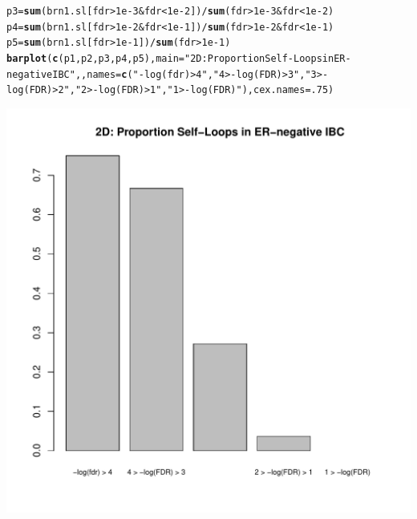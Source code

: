 \documentclass{article}\usepackage[]{graphicx}\usepackage[]{color}
\makeatletter
\def\maxwidth{ %
  \ifdim\Gin@nat@width>\linewidth
    \linewidth
  \else
    \Gin@nat@width
  \fi
}
\newcommand{\hlnum}[1]{\textcolor[rgb]{0.686,0.059,0.569}{#1}}%
\newcommand{\hlstr}[1]{\textcolor[rgb]{0.192,0.494,0.8}{#1}}%
\newcommand{\hlopt}[1]{\textcolor[rgb]{0,0,0}{#1}}%
\newcommand{\hlstd}[1]{\textcolor[rgb]{0.345,0.345,0.345}{#1}}%
\newcommand{\hlkwb}[1]{\textcolor[rgb]{0.69,0.353,0.396}{#1}}%
\newcommand{\hlkwc}[1]{\textcolor[rgb]{0.333,0.667,0.333}{#1}}%
\newcommand{\hlkwd}[1]{\textcolor[rgb]{0.737,0.353,0.396}{\textbf{#1}}}%
\newenvironment{kframe}{%
 \def\at@end@of@kframe{}%
 \ifinner\ifhmode%
  \def\at@end@of@kframe{\end{minipage}}%
  \begin{minipage}{\columnwidth}%
 \fi\fi%
 \def\FrameCommand##1{\hskip\@totalleftmargin \hskip-\fboxsep
 \colorbox{shadecolor}{##1}\hskip-\fboxsep
     \hskip-\linewidth \hskip-\@totalleftmargin \hskip\columnwidth}%
 \MakeFramed {\advance\hsize-\width
   \@totalleftmargin\z@ \linewidth\hsize
   \@setminipage}}%
 {\par\unskip\endMakeFramed%
 \at@end@of@kframe}
\newenvironment{knitrout}{}{} %
\makeatother
\begin{document}
\begin{knitrout}
\begin{kframe}
\begin{alltt}
\hlstd{p3}\hlkwb{=}\hlkwd{sum}\hlstd{(brn1.sl[fdr}\hlopt{>}\hlnum{1e-3} \hlopt{&} \hlstd{fdr}\hlopt{<}\hlnum{1e-2}\hlstd{])}\hlopt{/}\hlkwd{sum}\hlstd{(fdr}\hlopt{>}\hlnum{1e-3} \hlopt{&} \hlstd{fdr}\hlopt{<}\hlnum{1e-2}\hlstd{)}
\hlstd{p4}\hlkwb{=}\hlkwd{sum}\hlstd{(brn1.sl[fdr}\hlopt{>}\hlnum{1e-2} \hlopt{&} \hlstd{fdr}\hlopt{<}\hlnum{1e-1}\hlstd{])}\hlopt{/}\hlkwd{sum}\hlstd{(fdr}\hlopt{>}\hlnum{1e-2} \hlopt{&} \hlstd{fdr}\hlopt{<}\hlnum{1e-1}\hlstd{)}
\hlstd{p5}\hlkwb{=}\hlkwd{sum}\hlstd{(brn1.sl[fdr}\hlopt{>}\hlnum{1e-1}\hlstd{])}\hlopt{/}\hlkwd{sum}\hlstd{(fdr}\hlopt{>}\hlnum{1e-1}\hlstd{)}
\hlkwd{barplot}\hlstd{(}\hlkwd{c}\hlstd{(p1,p2,p3,p4,p5),}\hlkwc{main}\hlstd{=}\hlstr{"2D: Proportion Self-Loops in ER-negative IBC"}\hlstd{, ,}\hlkwc{names}\hlstd{=}\hlkwd{c}\hlstd{(}\hlstr{"-log(fdr) > 4"}\hlstd{,} \hlstr{"4 > -log(FDR) > 3"}\hlstd{,}\hlstr{"3 > -log(FDR) > 2"}\hlstd{,}\hlstr{"2 > -log(FDR) > 1"}\hlstd{,}\hlstr{"1 > -log(FDR)"}\hlstd{),}\hlkwc{cex.names}\hlstd{=}\hlnum{.75}\hlstd{)}
\end{alltt}
\end{kframe}
\includegraphics[width=\maxwidth]{figure/Figure_2-4} 

\end{knitrout}
\end{document}
